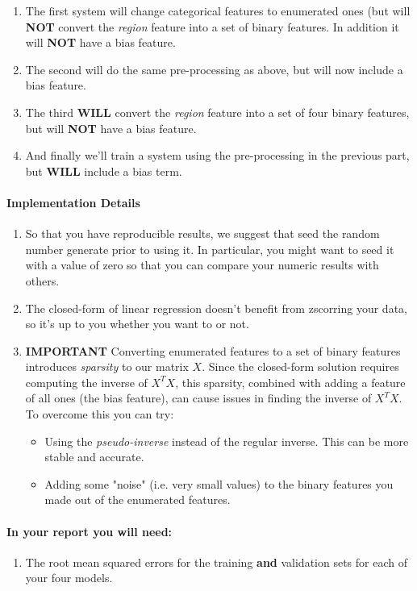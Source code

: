 \documentclass[12pt]{article}
\begin{document}
\begin{enumerate}
\item The first system will change categorical features to enumerated ones (but will \textbf{NOT} convert the \emph{region} feature into a set of binary features.  In addition it will \textbf{NOT} have a bias feature.
\item The second will do the same pre-processing as above, but will now include a bias feature.
\item The third \textbf{WILL} convert the \emph{region} feature into a set of four binary features, but will \textbf{NOT} have a bias feature.
\item And finally we'll train a system using the pre-processing in the previous part, but \textbf{WILL} include a bias term.
\end{enumerate}


\paragraph{Implementation Details}
\begin{enumerate}
\item So that you have reproducible results, we suggest that seed the random number generate prior to using it.  In particular, you might want to seed it with a value of zero so that you can compare your numeric results with others.
\item The closed-form of linear regression doesn't benefit from zscorring your data, so it's up to you whether you want to or not.
\item \textbf{IMPORTANT} Converting enumerated features to a set of binary features introduces \emph{sparsity} to our matrix $X$.  Since the closed-form solution requires computing the inverse of $X^TX$, this sparsity, combined with adding a feature of all ones (the bias feature), can cause issues in finding the inverse of $X^TX$.  To overcome this you can try:
\begin{itemize}
\item Using the \emph{pseudo-inverse} instead of the regular inverse.  This can be more stable and accurate.
\item Adding some "noise" (i.e. very small values) to the binary features you made out of the enumerated features.
\end{itemize} 
\end{enumerate}


\paragraph{In your report you will need:}
\begin{enumerate}
\item The root mean squared errors for the training \textbf{and} validation sets for each of your four models.
\end{enumerate}
\end{document}
